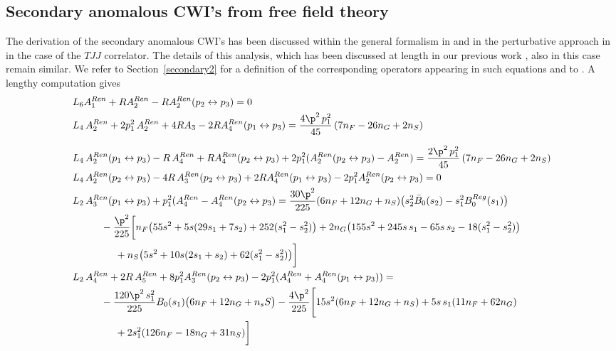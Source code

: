 \documentclass[a4paper,11pt,openright,twoside]{book}
\newcommand{\secref}[1]{Section~\ref{#1}}		%
\numberwithin{equation}{section}
\begin{document}
{{\subsection{Secondary anomalous CWI's from free field theory }
The derivation of the secondary anomalous CWI's has been discussed within the general formalism in \cite{Bzowski:2013sza}  and in the perturbative approach in \cite{Coriano:2018bbe} in the case of the $TJJ$ correlator. The details of this analysis, which has been discussed at length in our previous work \cite{Coriano:2018bbe}, also in this case remain similar. We refer to \secref{secondary2} for a definition of the corresponding operators appearing in such equations and to \cite{Coriano:2018bbe}.  A lengthy computation gives
\begin{align}
	&L_6 A^{Ren}_1+R A^{Ren}_2-R A^{Ren}_2(p_2\leftrightarrow p_3)=0\\ 
	&L_4\,A^{Ren}_2+2p_1^2\,A^{Ren}_2+4RA_3-2RA^{Ren}_4(p_1\leftrightarrow p_3)=\frac{4\p^2\,p_1^2}{45}\left(7n_F-26n_G+2n_S\right)\\[1.5ex]
	&L_4\,A^{Ren}_2(p_1\leftrightarrow p_3)-R\,A^{Ren}_4+RA^{Ren}_4(p_2\leftrightarrow p_3)+2p_1^2(A^{Ren}_2(p_2\leftrightarrow p_3)-A^{Ren}_2)=\frac{2\p^2\,p_1^2}{45}\left(7n_F-26n_G+2n_S\right)\\
	&L_4\,A^{Ren}_2(p_2\leftrightarrow p_3)-4R\,A^{Ren}_3(p_2\leftrightarrow p_3)+2RA^{Ren}_4(p_1\leftrightarrow p_3)-2p_1^2A^{Ren}_2(p_2\leftrightarrow p_3)=0\\
	&L_2\,A^{Ren}_3(p_1\leftrightarrow p_3)+p_1^2(A^{Ren}_4-A^{Ren}_4(p_2\leftrightarrow p_3)=\frac{30\p^2}{225}(6n_F+12n_G+n_S)\big(s_2^2 \bar{B}_0(s_2)-s_1^2B_0^{Reg}(s_1)\big)\notag\\
	&\hspace{+1cm}-\frac{\p^2}{225}\bigg[n_F\big(55s^2+5s(29s_1+7s_2)+252(s_1^2-s_2^2)\big)+2n_G\big(155s^2+245s\,s_1-65s\,s_2-18(s_1^2-s_2^2)\big)\notag\notag\\
	&\hspace{+1.5cm}+n_S\big(5s^2+10s(2s_1+s_2)+62(s_1^2-s_2^2)\big)\bigg]\\
	&L_2\,A^{Ren}_4+2R\,A^{Ren}_5+8p_1^2A^{Ren}_3(p_2\leftrightarrow p_3)-2p_1^2(A^{Ren}_4+A^{Ren}_4(p_1\leftrightarrow p_3))=\notag\notag\\
	&\hspace{+1cm}-\frac{120\p^2\,s_1^2}{225}B_0(s_1)\big(6n_F+12n_G+n_sS\big)-\frac{4\p^2}{225}\Bigg[15s^2(6n_F+12n_G+n_S)+5s\,s_1(11n_F+62n_G)\notag\notag\\
	&\hspace{+1.5cm}+2s_1^2(126n_F-18n_G+31n_S)\bigg]\\

\end{align}}}
\end{document}

